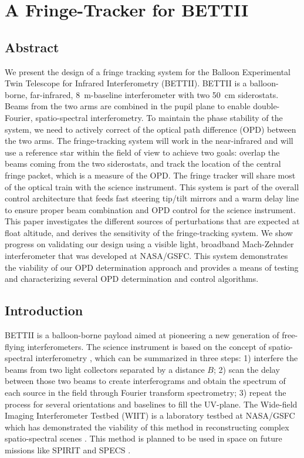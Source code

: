 
\chapter{A Fringe-Tracker for BETTII} %

\label{AppendixB} %

\section*{Abstract}
We present the design of a fringe tracking system for the Balloon Experimental Twin Telescope for Infrared Interferometry (BETTII). BETTII is a balloon-borne, far-infrared, 8~m-baseline interferometer with two 50~cm siderostats. Beams from the two arms are combined in the pupil plane to enable double-Fourier, spatio-spectral interferometry. To maintain the phase stability of the system, we need to actively correct of the optical path difference (OPD) between the two arms. The fringe-tracking system will work in the near-infrared and will use a reference star within the field of view to achieve two goals: overlap the beams coming from the two siderostats, and track the location of the central fringe packet, which is a measure of the OPD. The fringe tracker will share most of the optical train with the science instrument. This system is part of the overall control architecture that feeds fast steering tip/tilt mirrors and a warm delay line to ensure proper beam combination and OPD control for the science instrument. This paper investigates the different sources of perturbations that are expected at float altitude, and derives the sensitivity of the fringe-tracking system. We show progress on validating our design using a visible light, broadband Mach-Zehnder interferometer that was developed at NASA/GSFC. This system demonstrates the viability of our OPD determination approach and provides a means of testing and characterizing several OPD determination and control algorithms.  


\section{Introduction} \label{sec:INTRO}
BETTII is a balloon-borne payload aimed at pioneering a new generation of free-flying interferometers. The science instrument is based on the concept of spatio-spectral interferometry \citep{Mariotti:1988vea}, which can be summarized in three steps: 1) interfere the beams from two light collectors separated by a distance $B$; 2) scan the delay between those two beams to create interferograms and obtain the spectrum of each source in the field through Fourier transform spectrometry; 3) repeat the process for several orientations and baselines to fill the UV-plane. The Wide-field Imaging Interferometer Testbed \citep{Rinehart:2010hq} (WIIT) is a laboratory testbed at NASA/GSFC which has demonstrated the viability of this method in reconstructing complex spatio-spectral scenes \citep{Lyon:2008cna}. This method is planned to be used in space on future missions like SPIRIT \citep{Leisawitz:2007if} and SPECS \citep{Harwit:2006hl}.


